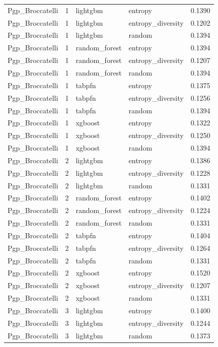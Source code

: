 \begin{tabular}{lrllr}
Pgp_Broccatelli & 1 & lightgbm & entropy & 0.1390 \\
Pgp_Broccatelli & 1 & lightgbm & entropy_diversity & 0.1202 \\
Pgp_Broccatelli & 1 & lightgbm & random & 0.1394 \\
Pgp_Broccatelli & 1 & random_forest & entropy & 0.1394 \\
Pgp_Broccatelli & 1 & random_forest & entropy_diversity & 0.1207 \\
Pgp_Broccatelli & 1 & random_forest & random & 0.1394 \\
Pgp_Broccatelli & 1 & tabpfn & entropy & 0.1375 \\
Pgp_Broccatelli & 1 & tabpfn & entropy_diversity & 0.1256 \\
Pgp_Broccatelli & 1 & tabpfn & random & 0.1394 \\
Pgp_Broccatelli & 1 & xgboost & entropy & 0.1322 \\
Pgp_Broccatelli & 1 & xgboost & entropy_diversity & 0.1250 \\
Pgp_Broccatelli & 1 & xgboost & random & 0.1394 \\
Pgp_Broccatelli & 2 & lightgbm & entropy & 0.1386 \\
Pgp_Broccatelli & 2 & lightgbm & entropy_diversity & 0.1228 \\
Pgp_Broccatelli & 2 & lightgbm & random & 0.1331 \\
Pgp_Broccatelli & 2 & random_forest & entropy & 0.1402 \\
Pgp_Broccatelli & 2 & random_forest & entropy_diversity & 0.1224 \\
Pgp_Broccatelli & 2 & random_forest & random & 0.1331 \\
Pgp_Broccatelli & 2 & tabpfn & entropy & 0.1404 \\
Pgp_Broccatelli & 2 & tabpfn & entropy_diversity & 0.1264 \\
Pgp_Broccatelli & 2 & tabpfn & random & 0.1331 \\
Pgp_Broccatelli & 2 & xgboost & entropy & 0.1520 \\
Pgp_Broccatelli & 2 & xgboost & entropy_diversity & 0.1207 \\
Pgp_Broccatelli & 2 & xgboost & random & 0.1331 \\
Pgp_Broccatelli & 3 & lightgbm & entropy & 0.1400 \\
Pgp_Broccatelli & 3 & lightgbm & entropy_diversity & 0.1244 \\
Pgp_Broccatelli & 3 & lightgbm & random & 0.1373 \\

\end{tabular}
